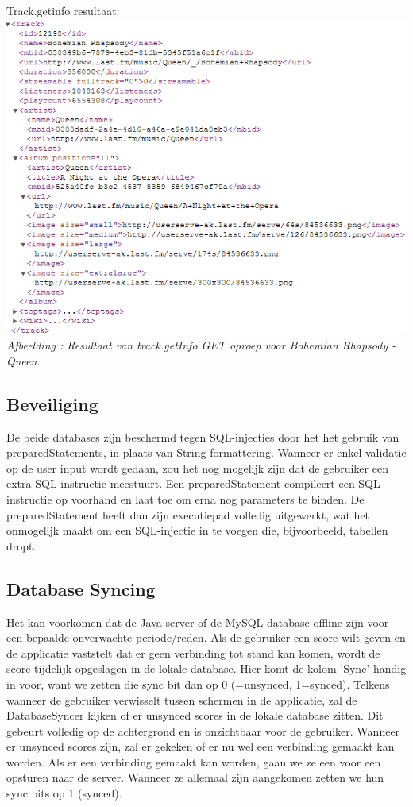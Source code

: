 \documentclass[11pt,a4paper]{article}
\newcounter{figc}
\newcommand{\figID} {%
   \stepcounter{figc}%
   \thefigc}
\begin{document}
	Track.getinfo resultaat: \\
	\includegraphics[width=15cm]{Pictures/track_getinfo.png}\\ \newline
	\small \textit{Afbeelding \figID : Resultaat van track.getInfo GET oproep voor Bohemian Rhapsody - Queen.}
	
	
	
	\subsection{Beveiliging}
	\label{sec:Beveiliging}
	De beide databases zijn beschermd tegen SQL-injecties door het het gebruik van preparedStatements, in plaats van String formattering. Wanneer er enkel validatie op de user input wordt gedaan, zou het nog mogelijk zijn dat de gebruiker een extra SQL-instructie meestuurt.
	Een preparedStatement compileert een SQL-instructie op voorhand en laat toe om erna nog parameters te binden. De preparedStatement heeft dan zijn executiepad volledig uitgewerkt, wat het onmogelijk maakt om een SQL-injectie in te voegen die, bijvoorbeeld, tabellen dropt. 
	
	
	\subsection{Database Syncing}
	\label{sec:Database Syncing}
	Het kan voorkomen dat de Java server of de MySQL database offline zijn voor een bepaalde onverwachte periode/reden. Als de gebruiker een score wilt geven en de applicatie vaststelt dat er geen verbinding tot stand kan komen, wordt de score tijdelijk opgeslagen in de lokale database. Hier komt de kolom 'Sync' handig in voor, want we zetten die sync bit dan op 0 (=unsynced, 1=synced). Telkens wanneer de gebruiker verwisselt tussen schermen in de applicatie, zal de DatabaseSyncer kijken of er unsynced scores in de lokale database zitten. Dit gebeurt volledig op de achtergrond en is onzichtbaar voor de gebruiker. Wanneer er unsynced scores zijn, zal er gekeken of er nu wel een verbinding gemaakt kan worden. Als er een verbinding gemaakt kan worden, gaan we ze een voor een opsturen naar de server. Wanneer ze allemaal zijn aangekomen zetten we hun sync bits op 1 (synced).
		
\end{document}
